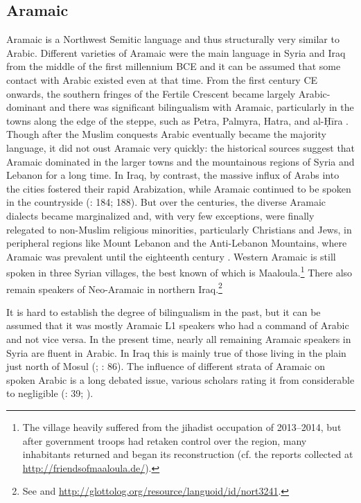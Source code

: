 \documentclass[output=paper]{langsci/langscibook}
\begin{document}
  \subsection{Aramaic} \label{aram}
Aramaic is a Northwest Semitic language and thus structurally very similar to Arabic. Different varieties of Aramaic were the main language in Syria and Iraq from the middle of the first millennium BCE and it can be assumed that some contact with Arabic existed even at that time. From the first century CE onwards, the southern fringes of the Fertile Crescent became largely Arabic-dominant and there was significant bilingualism with Aramaic, particularly in the towns along the edge of the steppe, such as Petra, Palmyra, Hatra, and al-Ḥīra \citep[260--262]{Procházka2018Fertile}. Though after the Muslim conquests Arabic eventually became the majority language, it did not oust Aramaic very quickly: the historical sources suggest that Aramaic dominated in the larger towns and the mountainous regions of Syria and Lebanon for a long time. In Iraq, by contrast, the massive influx of Arabs into the cities fostered their rapid Arabization, while Aramaic continued to be spoken in the countryside (\citealt{Magidow2013}: 184; 188). But over the centuries, the diverse Aramaic dialects became marginalized and, with very few exceptions, were finally relegated to non-Muslim religious minorities, particularly Christians and Jews, in peripheral regions like Mount Lebanon and the Anti-Lebanon Mountains, where Aramaic was prevalent until the eighteenth century \citep{Retsö2011}. Western Aramaic is still spoken in three Syrian villages, the best known of which is Maaloula.\footnote{The village heavily suffered from the jihadist occupation of 2013--2014, but after government troops had retaken control over the region, many inhabitants returned and began its reconstruction (cf. the reports collected at \url{http://friendsofmaaloula.de/}).} There also remain speakers of Neo-Aramaic in northern Iraq.\footnote{See \citet{Coghill2012} and \url{http://glottolog.org/resource/languoid/id/nort3241}.} 

It is hard to establish the degree of bilingualism in the past, but it can be assumed that it was mostly Aramaic L1 speakers who had a command of Arabic and not vice versa. In the present time, nearly all remaining Aramaic speakers in Syria are fluent in Arabic. In Iraq this is mainly true of those living in the plain just north of Mosul (\citealt{ArnoldBehnstedt1993}; \citealt{Coghill2012}: 86). The influence of different strata of Aramaic on spoken Arabic is a long debated issue, various scholars rating it from considerable to negligible (\citealt{Hopkins1995}: 39; \citealt{Lentin2018}).
\end{document}

